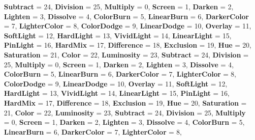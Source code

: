 \begin{DoxyCompactItemize}
{\bfseries Subtract} = 24, 
{\bfseries Division} = 25, 
\newline
{\bfseries Multiply} = 0, 
{\bfseries Screen} = 1, 
{\bfseries Darken} = 2, 
{\bfseries Lighten} = 3, 
\newline
{\bfseries Dissolve} = 4, 
{\bfseries Color\+Burn} = 5, 
{\bfseries Linear\+Burn} = 6, 
{\bfseries Darker\+Color} = 7, 
\newline
{\bfseries Lighter\+Color} = 8, 
{\bfseries Color\+Dodge} = 9, 
{\bfseries Linear\+Dodge} = 10, 
{\bfseries Overlay} = 11, 
\newline
{\bfseries Soft\+Light} = 12, 
{\bfseries Hard\+Light} = 13, 
{\bfseries Vivid\+Light} = 14, 
{\bfseries Linear\+Light} = 15, 
\newline
{\bfseries Pin\+Light} = 16, 
{\bfseries Hard\+Mix} = 17, 
{\bfseries Difference} = 18, 
{\bfseries Exclusion} = 19, 
\newline
{\bfseries Hue} = 20, 
{\bfseries Saturation} = 21, 
{\bfseries Color} = 22, 
{\bfseries Luminosity} = 23, 
\newline
{\bfseries Subtract} = 24, 
{\bfseries Division} = 25, 
{\bfseries Multiply} = 0, 
{\bfseries Screen} = 1, 
\newline
{\bfseries Darken} = 2, 
{\bfseries Lighten} = 3, 
{\bfseries Dissolve} = 4, 
{\bfseries Color\+Burn} = 5, 
\newline
{\bfseries Linear\+Burn} = 6, 
{\bfseries Darker\+Color} = 7, 
{\bfseries Lighter\+Color} = 8, 
{\bfseries Color\+Dodge} = 9, 
\newline
{\bfseries Linear\+Dodge} = 10, 
{\bfseries Overlay} = 11, 
{\bfseries Soft\+Light} = 12, 
{\bfseries Hard\+Light} = 13, 
\newline
{\bfseries Vivid\+Light} = 14, 
{\bfseries Linear\+Light} = 15, 
{\bfseries Pin\+Light} = 16, 
{\bfseries Hard\+Mix} = 17, 
\newline
{\bfseries Difference} = 18, 
{\bfseries Exclusion} = 19, 
{\bfseries Hue} = 20, 
{\bfseries Saturation} = 21, 
\newline
{\bfseries Color} = 22, 
{\bfseries Luminosity} = 23, 
{\bfseries Subtract} = 24, 
{\bfseries Division} = 25, 
\newline
{\bfseries Multiply} = 0, 
{\bfseries Screen} = 1, 
{\bfseries Darken} = 2, 
{\bfseries Lighten} = 3, 
\newline
{\bfseries Dissolve} = 4, 
{\bfseries Color\+Burn} = 5, 
{\bfseries Linear\+Burn} = 6, 
{\bfseries Darker\+Color} = 7, 
\newline
{\bfseries Lighter\+Color} = 8, 

\end{DoxyCompactItemize}
